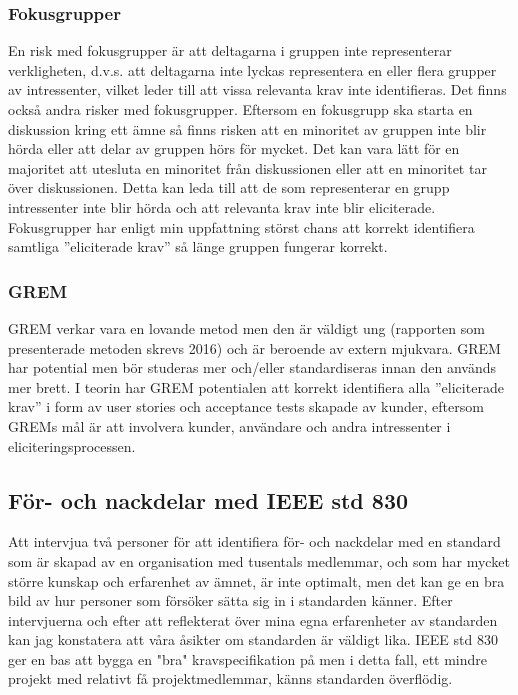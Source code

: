 \subsubsection{Fokusgrupper}
En risk med fokusgrupper är att deltagarna i gruppen inte representerar verkligheten, d.v.s. att deltagarna inte lyckas representera en eller flera grupper av intressenter, vilket leder till att vissa relevanta krav inte identifieras. Det finns också andra risker med fokusgrupper. Eftersom en fokusgrupp ska starta en diskussion kring ett ämne så finns risken att en minoritet av gruppen inte blir hörda eller att delar av gruppen hörs för mycket. Det kan vara lätt för en majoritet att utesluta en minoritet från diskussionen eller att en minoritet tar över diskussionen. Detta kan leda till att de som representerar en grupp intressenter inte blir hörda och att relevanta krav inte blir eliciterade. Fokusgrupper har enligt min uppfattning störst chans att korrekt identifiera samtliga ”eliciterade krav” så länge gruppen fungerar korrekt.

\subsubsection{GREM}
GREM verkar vara en lovande metod men den är väldigt ung (rapporten som presenterade metoden skrevs 2016) och är beroende av extern mjukvara. GREM har potential men bör studeras mer och/eller standardiseras innan den används mer brett. I teorin har GREM potentialen att korrekt identifiera alla ”eliciterade krav” i form av user stories och acceptance tests skapade av kunder, eftersom GREMs mål är att involvera kunder, användare och andra intressenter i eliciteringsprocessen.

\subsection{För- och nackdelar med IEEE std 830}
Att intervjua två personer för att identifiera för- och nackdelar med en standard som är skapad av en organisation med tusentals medlemmar, och som har mycket större kunskap och erfarenhet av ämnet, är inte optimalt, men det kan ge en bra bild av hur personer som försöker sätta sig in i standarden känner. Efter intervjuerna och efter att reflekterat över mina egna erfarenheter av standarden kan jag konstatera att våra åsikter om standarden är väldigt lika. IEEE std 830 ger en bas att bygga en "bra" kravspecifikation på men i detta fall, ett mindre projekt med relativt få projektmedlemmar, känns standarden överflödig.   
